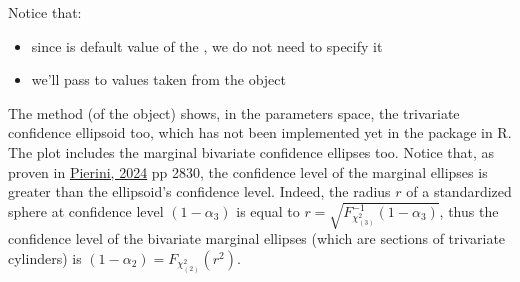\documentclass[letterpaper,10pt,english]{sphinxmanual}
\begin{document}
\sphinxAtStartPar
Notice that:
\begin{itemize}
\item {} 
\sphinxAtStartPar
since  is default value of the  , we do not need to specify it

\item {} 
\sphinxAtStartPar
we’ll pass to   values taken from the object 

\end{itemize}
\label{\detokenize{manual:confidence-ellipsoid}}
\sphinxAtStartPar
The method  (of the  object)
shows, in the parameters space, the trivariate confidence ellipsoid too, which has not
been implemented yet in the  package in R.
The plot includes the marginal bivariate confidence ellipses too. Notice that, as proven in
\hyperlink{cite.references:id41}{Pierini, 2024} pp 28\sphinxhyphen{}30, the confidence level of the marginal ellipses is greater
than the ellipsoid’s confidence level. Indeed, the radius \(r\) of a
standardized sphere at confidence
level \((1-\alpha_3)\) is equal to \(r = \sqrt{ F^{-1}_{\chi^2_{(3)}}(1-\alpha_3) }\), thus
the confidence level of the bivariate marginal ellipses (which are sections of trivariate
cylinders) is \((1-\alpha_2) = F_{\chi^2_{(2)}}(r^2)\).
\def\sphinxLiteralBlockLabel{\label{\detokenize{manual:id50}}}
\begin{sphinxVerbatim}[commandchars=\\\{\},numbers=left,firstnumber=1,stepnumber=1]
  
     
         \PYG{p}{[}\PYG{p}{]}
         \PYG{p}{[}\PYG{p}{]}
         \PYG{p}{[}\PYG{p}{]}
\end{sphinxVerbatim}
\end{document}
